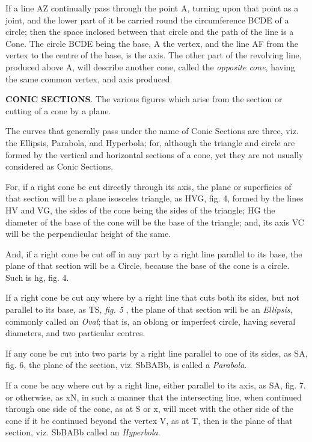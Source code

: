 If a line AZ continually pass through the point A, turning upon that point as a joint, and the lower part of it be carried round the circumference BCDE of a circle; then the space inclosed between that circle and the path of the line is a Cone. The circle BCDE being the base, A the vertex, and the line AF from the vertex to the centre of the base, is the axis. The other part of the revolving line, produced above A, will describe another cone, called the \textit{opposite cone}, having the same common vertex, and axis produced. 

\textbf{CONIC SECTIONS}. The various figures which arise from the section or cutting of a cone by a plane. 

The curves that generally pass under the name of Conic Sections are three, viz. the Ellipsis, Parabola, and Hyperbola; for, although the triangle and circle are formed by the vertical and horizontal sections of a cone, yet they are not usually considered as Conic Sections.

For, if a right cone be cut directly through its axis, the plane or superficies of that section will be a plane isosceles triangle, as HVG, fig. 4, formed by the lines HV and VG, the sides of the cone being the sides of the triangle; HG the diameter of the base of the cone will be the base of the triangle; and, its axis VC will be the perpendicular height of the same. 

And, if a right cone be cut off in any part by a right line parallel to its base, the plane of that section will be a Circle, because the base of the cone is a circle. Such is hg, fig. 4. 

If a right cone be cut any where by a right line that cuts both its sides, but not parallel to its base, as TS, \textit{fig. 5} , the plane of that section will be an \textit{Ellipsis}, commonly called an \textit{Oval}; that is, an oblong or imperfect circle, having several diameters, and two particular centres. 

If any cone be cut into two parts by a right line parallel to one of its sides, as SA, fig. 6, the plane of the section, viz. SbBABb, is called a \textit{Parabola}. 

If a cone be any where cut by a right line, either parallel to its axis, as SA, fig. 7. or otherwise, as xN, in such a manner that the intersecting line, when continued through one side of the cone, as at S or x, will meet with the other side of the cone if it be continued beyond the vertex V, as at T, then is the plane of that section, viz. SbBABb called an \textit{Hyperbola}. 

